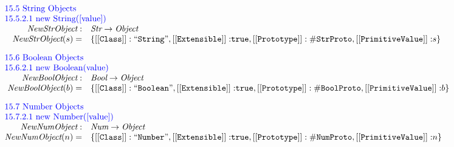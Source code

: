 \documentclass[a4paper, leqno]{amsart}
\def\inblue{\color{blue}}
\newcommand{\true}{{\tt true}}
\newcommand{\Bool}{\emph{Bool}}
\newcommand{\Obj}{\emph{Object}}
\newcommand{\Str}{\emph{Str}}
\newcommand{\Num}{\emph{Num}}
\newcommand{\hf}[1]{\emph{#1}}
\def\inblue{\color{blue}}
\begin{document}
\[\begin{array}{rl}
\multicolumn{2}{l}{\mbox{\inblue 15.5 String Objects}}\\
\multicolumn{2}{l}{\mbox{\inblue 15.5.2.1 new String([value])}}\\
\hf{NewStrObject} : & \Str \rightarrow \Obj\\
\hf{NewStrObject}(s)=&
 {\tt \{[[Class]]: ``String"}, {\tt [[Extensible]]:} \true,%
{\tt [[Prototype]]: \#StrProto},
{\tt [[PrimitiveValue]]:} s\} \\[1em]

\multicolumn{2}{l}{\mbox{\inblue 15.6 Boolean Objects}}\\
\multicolumn{2}{l}{\mbox{\inblue 15.6.2.1 new Boolean(value)}}\\
\hf{NewBoolObject} : & \Bool \rightarrow \Obj\\
\hf{NewBoolObject}(b)=&
 {\tt \{[[Class]]: ``Boolean"}, {\tt [[Extensible]]:} \true,
{\tt [[Prototype]]: \#BoolProto},
{\tt [[PrimitiveValue]]:} b\} \\[1em]%

\multicolumn{2}{l}{\mbox{\inblue 15.7 Number Objects}}\\
\multicolumn{2}{l}{\mbox{\inblue 15.7.2.1 new Number([value])}}\\
\hf{NewNumObject}: & \Num \rightarrow \Obj\\
\hf{NewNumObject}(n)=&
 {\tt \{[[Class]]: ``Number"}, {\tt [[Extensible]]:} \true,
{\tt [[Prototype]]: \#NumProto},
{\tt [[PrimitiveValue]]:} n\}%
\\[2em]

\end{array}
\]
\end{document}
